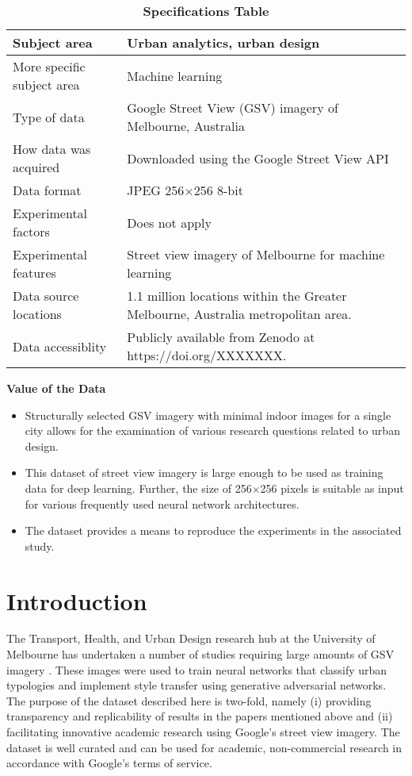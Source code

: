 \documentclass[final,3p,times,authoryear]{elsarticle}
\begin{document}

\begin{table}[!htbp]
\caption{\bf Specifications Table \label{tab:spectable}}     
\begin{tabular}{ |l | l| }
 \hline    
Subject area & Urban analytics, urban design   \\ \hline
More specific subject area & Machine learning  \\ \hline
Type of data & Google Street View (GSV) imagery of Melbourne, Australia  \\ \hline
How data was acquired & Downloaded using the Google Street View API \citep{GoogleMaps2017b}  \\ \hline
Data format & JPEG 256$\times$256 8-bit  \\ \hline
Experimental factors & Does not apply  \\ \hline
Experimental features & Street view imagery of Melbourne for machine learning  \\ \hline
Data source locations & 1.1 million locations within the Greater Melbourne, Australia metropolitan area.  \\ \hline
Data accessiblity & Publicly available from Zenodo at https://doi.org/XXXXXXX.    \\ \hline
\end{tabular}
\end{table}

\textbf{Value of the Data}
\begin{itemize}
\item Structurally selected GSV imagery with minimal indoor images for a single city allows for the examination of various research questions related to urban design.
\item This dataset of street view imagery is large enough to be used as training data for deep learning. Further, the size of 256$\times$256 pixels is suitable as input for various frequently used neural network architectures.
\item The dataset provides a means to reproduce the experiments in the associated study.
\end{itemize}

\section{Introduction}
\label{sec:introduction}

The Transport, Health, and Urban Design research hub at the University of Melbourne has undertaken a number of studies \citep[e.g.,][]{nice2018paris, wijnands2018urban} requiring large amounts of GSV imagery \citep{GoogleMaps2017b}. These images were used to train neural networks that classify urban typologies and implement style transfer using generative adversarial networks. The purpose of the dataset described here is two-fold, namely (i) providing transparency and replicability of results in the papers mentioned above and (ii) facilitating innovative academic research using Google's street view imagery. The dataset is well curated and can be used for academic, non-commercial research in accordance with Google's terms of service.
\end{document}
